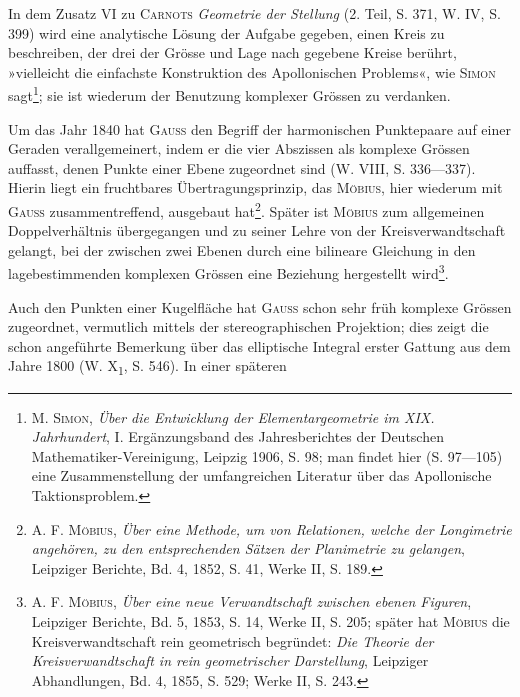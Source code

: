 \clearpage{}\setcounter{footnote}{0}
\noindent\hspace*{\parindent}In dem Zusatz VI zu \textsc{Carnots} \textit{Geometrie der Stellung} (2. Teil, S. 371,
W. IV, S. 399) wird eine analytische Lösung der Aufgabe gegeben, einen
Kreis zu beschreiben, der drei der Grösse und Lage nach gegebene Kreise
berührt, »vielleicht die einfachste Konstruktion des Apollonischen Problems«,
wie \textsc{Simon} sagt\footnote{M. \textsc{Simon}, \textit{Über die Entwicklung der Elementargeometrie im XIX. Jahrhundert}, I. Ergänzungsband des Jahresberichtes der Deutschen Mathematiker-Vereinigung, Leipzig 1906, S. 98; man findet hier (S. 97—105) eine Zusammenstellung der umfangreichen Literatur über das Apollonische Taktionsproblem.}; sie ist wiederum der Benutzung komplexer Grössen zu verdanken.
\par
Um das Jahr 1840 hat \textsc{Gauss} den Begriff der harmonischen Punktepaare
auf einer Geraden verallgemeinert, indem er die vier Abszissen als komplexe
Grössen auffasst, denen Punkte einer Ebene zugeordnet sind (W. VIII, S. 336—337).
Hierin liegt ein fruchtbares Übertragungsprinzip, das \textsc{Möbius}, hier
wiederum mit \textsc{Gauss} zusammentreffend, ausgebaut hat\footnote{A. F. \textsc{Möbius}, \textit{Über eine Methode, um von Relationen, welche der Longimetrie angehören, zu den entsprechenden Sätzen der Planimetrie zu gelangen}, Leipziger Berichte, Bd. 4, 1852, S. 41, Werke II, S. 189.}. Später ist \textsc{Möbius}
zum allgemeinen Doppelverhältnis übergegangen und zu seiner Lehre von der
Kreisverwandtschaft gelangt, bei der zwischen zwei Ebenen durch eine bilineare
Gleichung in den lagebestimmenden komplexen Grössen eine Beziehung hergestellt
wird\footnote{A. F. \textsc{Möbius}, \textit{Über eine neue Verwandtschaft zwischen ebenen Figuren}, Leipziger Berichte, Bd. 5, 1853, S. 14, Werke II, S. 205; später hat \textsc{Möbius} die Kreisverwandtschaft rein geometrisch begründet: \textit{Die Theorie der Kreisverwandtschaft in rein geometrischer Darstellung}, Leipziger Abhandlungen, Bd. 4, 1855, S. 529; Werke II, S. 243.}.
\par
Auch den Punkten einer Kugelfläche hat \textsc{Gauss} schon sehr früh komplexe
Grössen zugeordnet, vermutlich mittels der stereographischen Projektion; dies
zeigt die schon angeführte Bemerkung über das elliptische Integral erster
Gattung aus dem Jahre 1800 (W. X\textsubscript{1}, S. 546). In einer späteren
\clearpage{}\setcounter{footnote}{0}
